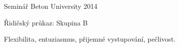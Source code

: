 \vspace{1.5cm}



\begin{cvhonors}

  \cvhonor
    {}%
    {Seminář Beton University 2014} %



\end{cvhonors}
\vspace{5pt}


\begin{cvhonors}

  \cvhonor
    {}%
    {Řidičský průkaz: Skupina B} %



\end{cvhonors}
\vspace{5pt}


\begin{cvhonors}

  \cvhonor
    {} %
    {Flexibilita, entuziasmus, přijemné vystupování, pečlivost.} %

\end{cvhonors}
\vspace{5pt}


